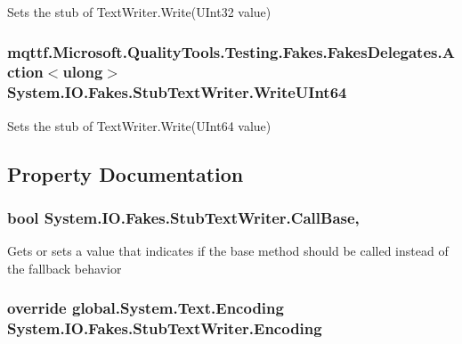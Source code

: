 Sets the stub of Text\-Writer.\-Write(\-U\-Int32 value)

\hypertarget{class_system_1_1_i_o_1_1_fakes_1_1_stub_text_writer_a5512898dcea58b876633a5ef337c6b23}{
\subsubsection[{Write\-U\-Int64}]{\setlength{\rightskip}{0pt plus 5cm}mqttf.\-Microsoft.\-Quality\-Tools.\-Testing.\-Fakes.\-Fakes\-Delegates.\-Action$<$ulong$>$ System.\-I\-O.\-Fakes.\-Stub\-Text\-Writer.\-Write\-U\-Int64}}\label{class_system_1_1_i_o_1_1_fakes_1_1_stub_text_writer_a5512898dcea58b876633a5ef337c6b23}


Sets the stub of Text\-Writer.\-Write(\-U\-Int64 value)



\subsection{Property Documentation}
\hypertarget{class_system_1_1_i_o_1_1_fakes_1_1_stub_text_writer_abfe2ad4b7fcfacf7471d3cb61f4853c5}{
\subsubsection[{Call\-Base}]{\setlength{\rightskip}{0pt plus 5cm}bool System.\-I\-O.\-Fakes.\-Stub\-Text\-Writer.\-Call\-Base\hspace{0.3cm}{\ttfamily [get]}, {\ttfamily [set]}}}\label{class_system_1_1_i_o_1_1_fakes_1_1_stub_text_writer_abfe2ad4b7fcfacf7471d3cb61f4853c5}


Gets or sets a value that indicates if the base method should be called instead of the fallback behavior

\hypertarget{class_system_1_1_i_o_1_1_fakes_1_1_stub_text_writer_a09bfb20c1c0244ed2e7c8ffbf3b06ab1}{
\subsubsection[{Encoding}]{\setlength{\rightskip}{0pt plus 5cm}override global.\-System.\-Text.\-Encoding System.\-I\-O.\-Fakes.\-Stub\-Text\-Writer.\-Encoding\hspace{0.3cm}{\ttfamily [get]}}}\label{class_system_1_1_i_o_1_1_fakes_1_1_stub_text_writer_a09bfb20c1c0244ed2e7c8ffbf3b06ab1}



